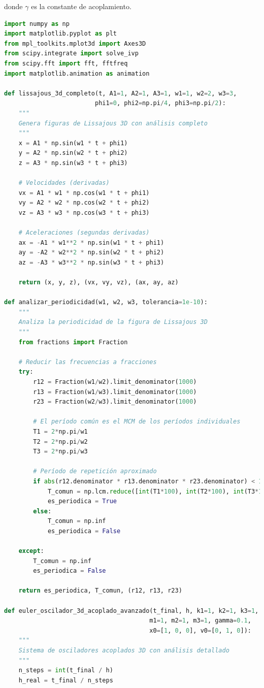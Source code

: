 \documentclass{article}
\begin{document}
	donde $\gamma$ es la constante de acoplamiento.

	\begin{lstlisting}[language=Python, caption={Análisis completo de figuras de Lissajous 3D y osciladores acoplados}]
import numpy as np
import matplotlib.pyplot as plt
from mpl_toolkits.mplot3d import Axes3D
from scipy.integrate import solve_ivp
from scipy.fft import fft, fftfreq
import matplotlib.animation as animation

def lissajous_3d_completo(t, A1=1, A2=1, A3=1, w1=1, w2=2, w3=3, 
                         phi1=0, phi2=np.pi/4, phi3=np.pi/2):
    """
    Genera figuras de Lissajous 3D con análisis completo
    """
    x = A1 * np.sin(w1 * t + phi1)
    y = A2 * np.sin(w2 * t + phi2)
    z = A3 * np.sin(w3 * t + phi3)
    
    # Velocidades (derivadas)
    vx = A1 * w1 * np.cos(w1 * t + phi1)
    vy = A2 * w2 * np.cos(w2 * t + phi2)
    vz = A3 * w3 * np.cos(w3 * t + phi3)
    
    # Aceleraciones (segundas derivadas)
    ax = -A1 * w1**2 * np.sin(w1 * t + phi1)
    ay = -A2 * w2**2 * np.sin(w2 * t + phi2)
    az = -A3 * w3**2 * np.sin(w3 * t + phi3)
    
    return (x, y, z), (vx, vy, vz), (ax, ay, az)

def analizar_periodicidad(w1, w2, w3, tolerancia=1e-10):
    """
    Analiza la periodicidad de la figura de Lissajous 3D
    """
    from fractions import Fraction
    
    # Reducir las frecuencias a fracciones
    try:
        r12 = Fraction(w1/w2).limit_denominator(1000)
        r13 = Fraction(w1/w3).limit_denominator(1000)
        r23 = Fraction(w2/w3).limit_denominator(1000)
        
        # El período común es el MCM de los períodos individuales
        T1 = 2*np.pi/w1
        T2 = 2*np.pi/w2
        T3 = 2*np.pi/w3
        
        # Período de repetición aproximado
        if abs(r12.denominator * r13.denominator * r23.denominator) < 1000:
            T_comun = np.lcm.reduce([int(T1*100), int(T2*100), int(T3*100)]) / 100
            es_periodica = True
        else:
            T_comun = np.inf
            es_periodica = False
            
    except:
        T_comun = np.inf
        es_periodica = False
    
    return es_periodica, T_comun, (r12, r13, r23)

def euler_oscilador_3d_acoplado_avanzado(t_final, h, k1=1, k2=1, k3=1, 
                                        m1=1, m2=1, m3=1, gamma=0.1,
                                        x0=[1, 0, 0], v0=[0, 1, 0]):
    """
    Sistema de osciladores acoplados 3D con análisis detallado
    """
    n_steps = int(t_final / h)
    h_real = t_final / n_steps
    

\end{lstlisting}
\end{document}

